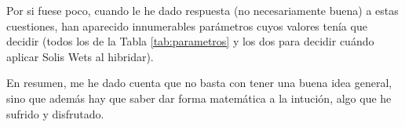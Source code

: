 \documentclass{article}
\begin{document}
Por si fuese poco, cuando le he dado respuesta (no necesariamente buena) a estas cuestiones, han aparecido innumerables parámetros cuyos
valores tenía que decidir (todos los de la Tabla \ref{tab:parametros} y los dos para decidir cuándo aplicar Solis Wets al hibridar).

En resumen, me he dado cuenta que no basta con tener una buena idea general, sino que además hay que saber dar forma matemática a la intución,
algo que he sufrido y disfrutado.
\end{document}
